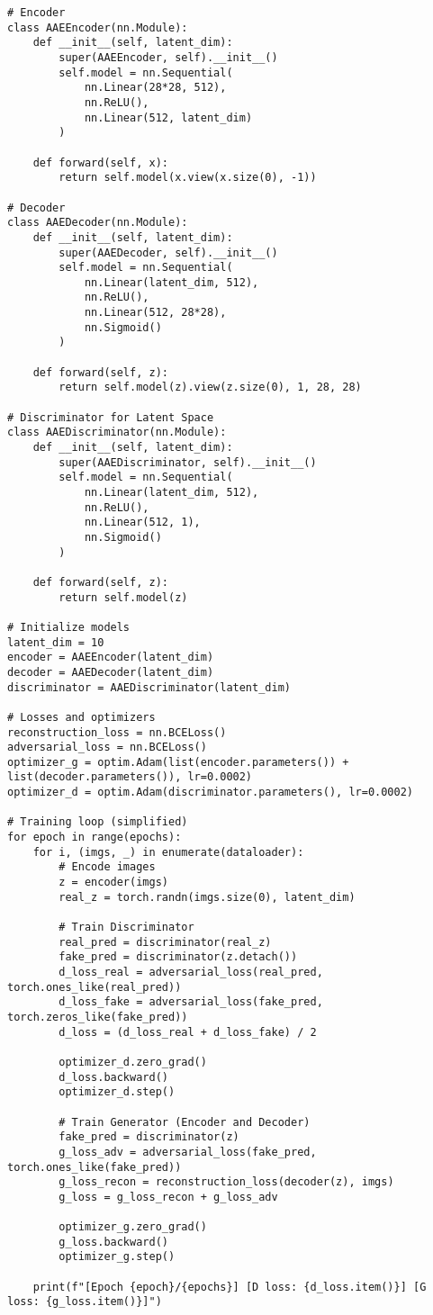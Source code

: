 \begin{lstlisting}[style=python]
# Encoder
class AAEEncoder(nn.Module):
    def __init__(self, latent_dim):
        super(AAEEncoder, self).__init__()
        self.model = nn.Sequential(
            nn.Linear(28*28, 512),
            nn.ReLU(),
            nn.Linear(512, latent_dim)
        )
    
    def forward(self, x):
        return self.model(x.view(x.size(0), -1))

# Decoder
class AAEDecoder(nn.Module):
    def __init__(self, latent_dim):
        super(AAEDecoder, self).__init__()
        self.model = nn.Sequential(
            nn.Linear(latent_dim, 512),
            nn.ReLU(),
            nn.Linear(512, 28*28),
            nn.Sigmoid()
        )
    
    def forward(self, z):
        return self.model(z).view(z.size(0), 1, 28, 28)

# Discriminator for Latent Space
class AAEDiscriminator(nn.Module):
    def __init__(self, latent_dim):
        super(AAEDiscriminator, self).__init__()
        self.model = nn.Sequential(
            nn.Linear(latent_dim, 512),
            nn.ReLU(),
            nn.Linear(512, 1),
            nn.Sigmoid()
        )
    
    def forward(self, z):
        return self.model(z)

# Initialize models
latent_dim = 10
encoder = AAEEncoder(latent_dim)
decoder = AAEDecoder(latent_dim)
discriminator = AAEDiscriminator(latent_dim)

# Losses and optimizers
reconstruction_loss = nn.BCELoss()
adversarial_loss = nn.BCELoss()
optimizer_g = optim.Adam(list(encoder.parameters()) + list(decoder.parameters()), lr=0.0002)
optimizer_d = optim.Adam(discriminator.parameters(), lr=0.0002)

# Training loop (simplified)
for epoch in range(epochs):
    for i, (imgs, _) in enumerate(dataloader):
        # Encode images
        z = encoder(imgs)
        real_z = torch.randn(imgs.size(0), latent_dim)

        # Train Discriminator
        real_pred = discriminator(real_z)
        fake_pred = discriminator(z.detach())
        d_loss_real = adversarial_loss(real_pred, torch.ones_like(real_pred))
        d_loss_fake = adversarial_loss(fake_pred, torch.zeros_like(fake_pred))
        d_loss = (d_loss_real + d_loss_fake) / 2

        optimizer_d.zero_grad()
        d_loss.backward()
        optimizer_d.step()

        # Train Generator (Encoder and Decoder)
        fake_pred = discriminator(z)
        g_loss_adv = adversarial_loss(fake_pred, torch.ones_like(fake_pred))
        g_loss_recon = reconstruction_loss(decoder(z), imgs)
        g_loss = g_loss_recon + g_loss_adv

        optimizer_g.zero_grad()
        g_loss.backward()
        optimizer_g.step()

    print(f"[Epoch {epoch}/{epochs}] [D loss: {d_loss.item()}] [G loss: {g_loss.item()}]")
\end{lstlisting}

